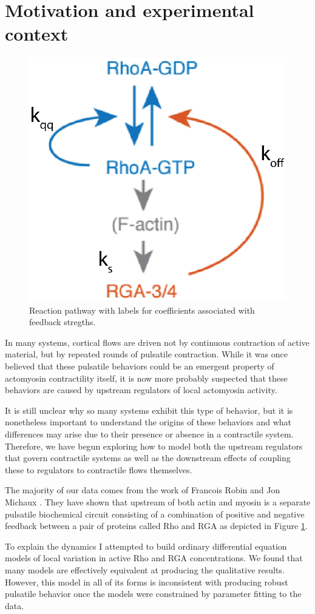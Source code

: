\section{Motivation and experimental context}
\begin{figure}[h!]
	\centering
	\includegraphics[width=0.5\hsize]{pulse/diagram_eq.eps}
	\caption{\label{fig:pulse_diag}  Reaction pathway with labels for coefficients associated with feedback stregths.}
\end{figure}

In many systems, cortical flows are driven not by continuous contraction of active material, but by repeated rounds of pulsatile contraction.  While it was once believed that these pulsatile behaviors could be an emergent property of actomyosin contractility itself\cite{Munro2004413}, it is now more probably suspected that these behaviors are caused by upstream regulators of local actomyosin activity.

It is still unclear why so many systems exhibit this type of behavior, but it is nonetheless important to understand the origins of these behaviors and what differences may arise due to their presence or absence in a contractile system.  Therefore, we have begun exploring how to model both the upstream regulators that govern contractile systems as well as the downstream effects of coupling these to regulators to contractile flows themselves.

The majority of our data comes from the work of Francois Robin and Jon Michaux \cite{Robin076356}.  They have shown that upstream of both actin and myosin is a separate pulsatile biochemical circuit consisting of a combination of positive and negative feedback between a pair of proteins called Rho and RGA as depicted in Figure \ref{fig:pulse_diag}.  

To explain the dynamics I attempted to build ordinary differential equation models of local variation in active Rho and RGA concentrations.  We found that many models are effectively equivalent at producing the qualitative results.  However, this model in all of its forms is inconsistent with producing robust pulsatile behavior once the models were constrained by parameter fitting to the data. 

